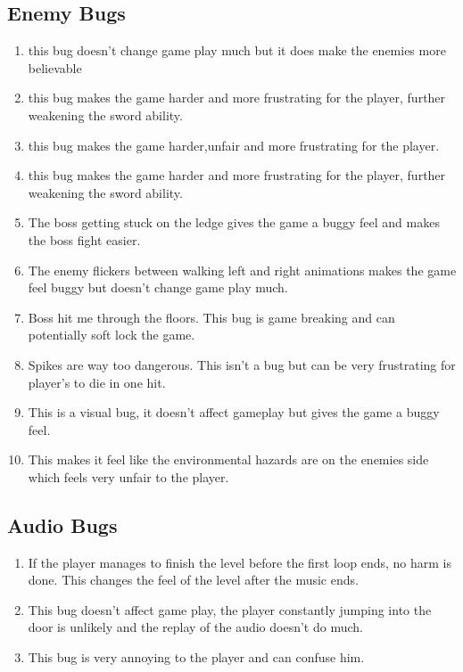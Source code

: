\documentclass{article}
\begin{document}
\subsection*{Enemy Bugs}
\begin{enumerate}
	\item this bug doesn't change game play much but it does make the enemies more believable 
	\item this bug makes the game harder and more frustrating for the player, further weakening the sword ability.
	\item this bug makes the game harder,unfair and more frustrating for the player.
	\item this bug makes the game harder and more frustrating for the player, further weakening the sword ability.
	\item The boss getting stuck on the ledge gives the game a buggy feel and makes the boss fight easier.
	\item The enemy flickers between walking left and right animations makes the game feel buggy but doesn't change game play much. 
	\item Boss hit me through the floors. This bug is game breaking and can potentially soft lock the game.
	\item Spikes are way too dangerous. This isn't a bug but can be very frustrating for player's to die in one hit.
	\item This is a visual bug, it doesn't affect gameplay but gives the game a buggy feel. 
	\item This makes it feel like the environmental hazards are on the enemies side which feels very unfair to the player.
	
\end{enumerate}
\subsection*{Audio Bugs}
\begin{enumerate}
	\item If the player manages to finish the level before the first loop ends, no harm is done. This changes the feel of the level after the music ends.  
	\item This bug doesn't affect game play, the player constantly jumping into the door is unlikely and the replay of the audio doesn't do much.
	\item This bug is very annoying to the player and can confuse him.
\end{enumerate}
\end{document}
